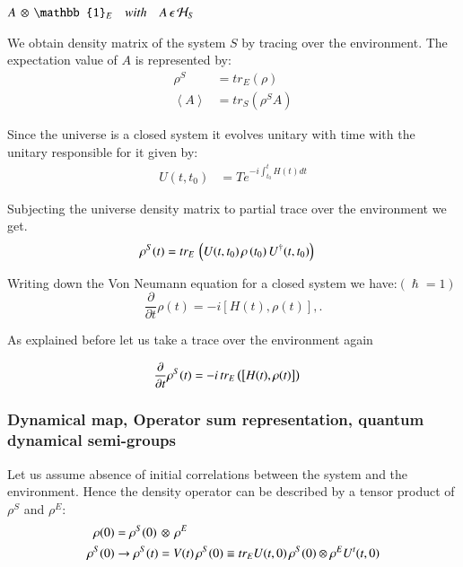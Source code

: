 \begin{center}
$A\thinspace \otimes\thinspace\mathbb{1}_{E} \quad with \quad A \thinspace  \epsilon \thinspace \mathcal{H}_{S}$
\end{center}

We obtain  density matrix of the system ${S}$ by tracing over the  environment. The expectation value of $A$ is represented by:
\begin{align}\label{aft33:44}
\rho^{S} &= tr_{E}(\rho)\\
\left\langle {A}\right\rangle &=tr_{S}(\rho^{S} {A}) 
\end{align}

Since the universe is a closed system it evolves unitary with time with the unitary responsible for it given by:
\begin{align}\label{aft33:45}
U\left( t,{ t }_{ 0 } \right) &=T{ e }^{ -i\int _{ { t }_{ 0 } }^{ t }{ H\left( t \right) dt }  }
\end{align}

Subjecting the universe density matrix to partial trace over the environment we get.  
\begin{align}\label{lowsleep:1}
\rho^{S}(t)&=tr_{E}\thinspace\left( U(t,t_{0})\thinspace \rho\thinspace (t_{0})\thinspace U^{\dagger}(t,t_{0})\right)
\end{align}

Writing down the Von Neumann equation for a closed system we have:$(\hslash=1)$
\[\frac { \partial}{ \partial t }\rho(t)=-i\left[H(t),\rho(t)\right], .\]

As explained before let us take a trace over the environment again

\begin{align}\label{aft33:46}
\frac { \partial}{ \partial t }\rho^{S}(t) &= -i \thinspace tr_{E}
\left( \left[H(t),\rho(t)\right] \right)
\end{align}

\subsubsection{Dynamical map, Operator sum representation, quantum dynamical semi-groups}

Let us assume absence of initial correlations between the system and the environment. Hence  the density operator can be described by a tensor product of $\rho^{S}$ and $\rho^{E}$:
\begin{align}\label{aft33:47}
\rho(0) &=\rho^{S}(0)\thinspace \otimes\thinspace \rho^{E}\\
\rho^{S}(0)&\rightarrow\rho^{S}(t)=V(t)\thinspace\rho^{S}(0)\equiv t{r}_{E }U(t,0)\thinspace{\rho}^{S}(0)\otimes { \rho}^{E}{U}^{t}(t,0)
\end{align}

